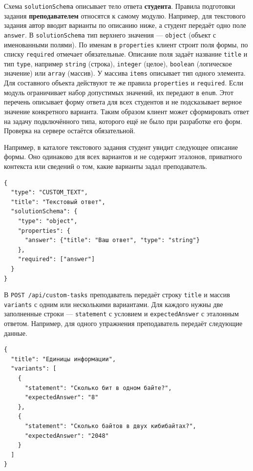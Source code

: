 \documentclass[12pt,a4paper]{article}
\begin{document}
Схема \texttt{solution\allowbreak{}Schema} описывает тело ответа \textbf{студента}. Правила подготовки задания \textbf{преподавателем} относятся к самому модулю. Например, для текстового задания автор вводит варианты по описанию ниже, а студент передаёт одно поле \texttt{answer}. В \texttt{solution\allowbreak{}Schema} тип верхнего значения --- \texttt{object} (объект с именованными полями). По именам в \texttt{properties} клиент строит поля формы, по списку \texttt{required} отмечает обязательные. Описание поля задаёт название \texttt{title} и тип \texttt{type}, например \texttt{string} (строка), \texttt{integer} (целое), \texttt{boolean} (логическое значение) или \texttt{array} (массив). У массива \texttt{items} описывает тип одного элемента. Для составного объекта действуют те же правила \texttt{properties} и \texttt{required}. Если модуль ограничивает набор допустимых значений, их передают в \texttt{enum}. Этот перечень описывает форму ответа для всех студентов и не подсказывает верное значение конкретного варианта. Таким образом клиент может сформировать ответ на задачу подключённого типа, которого ещё не было при разработке его форм. Проверка на сервере остаётся обязательной.

Например, в каталоге текстового задания студент увидит следующее описание формы. Оно одинаково для всех вариантов и не содержит эталонов, приватного контекста или сведений о том, какие варианты задал преподаватель.

\begin{verbatim}
{
  "type": "CUSTOM_TEXT",
  "title": "Текстовый ответ",
  "solutionSchema": {
    "type": "object",
    "properties": {
      "answer": {"title": "Ваш ответ", "type": "string"}
    },
    "required": ["answer"]
  }
}
\end{verbatim}

В \texttt{POST /\allowbreak{}api/\allowbreak{}custom-\allowbreak{}tasks} преподаватель передаёт строку \texttt{title} и массив \texttt{variants} с одним или несколькими вариантами. Для каждого нужны две заполненные строки --- \texttt{statement} с условием и \texttt{expected\allowbreak{}Answer} с эталонным ответом. Например, для одного упражнения преподаватель передаёт следующие данные.

\begin{verbatim}
{
  "title": "Единицы информации",
  "variants": [
    {
      "statement": "Сколько бит в одном байте?",
      "expectedAnswer": "8"
    },
    {
      "statement": "Сколько байтов в двух кибибайтах?",
      "expectedAnswer": "2048"
    }
  ]
}
\end{verbatim}
\end{document}
